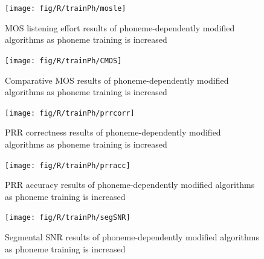 \begin{figure}[p]
\noindent \begin{centering}
\texttt{[image: fig/R/trainPh/mosle]}
\par\end{centering}

\protect\caption{\label{fig:vary-train-phn-mosle}\acs{MOS} listening effort results
of phoneme-dependently modified algorithms as phoneme training is
increased}
\end{figure}


\begin{figure}[p]
\noindent \begin{centering}
\texttt{[image: fig/R/trainPh/CMOS]}
\par\end{centering}

\protect\caption{\label{fig:vary-train-phn-cmos}Comparative \acs{MOS} results of
phoneme-dependently modified algorithms as phoneme training is increased}
\end{figure}


\begin{figure}[p]
\noindent \begin{centering}
\texttt{[image: fig/R/trainPh/prrcorr]}
\par\end{centering}

\protect\caption{\label{fig:vary-train-phn-prrcorr} \acs{PRR} correctness results
of phoneme-dependently modified algorithms as phoneme training is
increased}
\end{figure}


\begin{figure}[p]
\noindent \begin{centering}
\texttt{[image: fig/R/trainPh/prracc]}
\par\end{centering}

\protect\caption{\label{fig:vary-train-phn-prracc} \acs{PRR} accuracy results of
phoneme-dependently modified algorithms as phoneme training is increased}
\end{figure}


\begin{figure}[p]
\noindent \begin{centering}
\texttt{[image: fig/R/trainPh/segSNR]}
\par\end{centering}

\protect\caption{\label{fig:vary-train-phn-segsnr}Segmental \acs{SNR} results of
phoneme-dependently modified algorithms as phoneme training is increased}
\end{figure}


